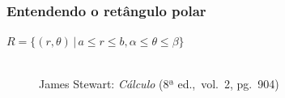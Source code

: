 \documentclass[pdftex, brazil, aspectratio=169]{beamer}
\begin{document}
\begin{frame}
  \frametitle{Entendendo o retângulo polar}
  \centering
  $R = \{(r,\theta)\, | \, a \le r \le b, \alpha \le \theta \le \beta\}$
  \begin{figure}[H]
    \begin{center}
      \label{fig:int2-29}
      \\
      \footnotesize{James Stewart: \emph{Cálculo} (8ª ed.,\ vol.\ 2, pg.\ 904)}
    \end{center}
  \end{figure}
\end{frame}
\end{document}
